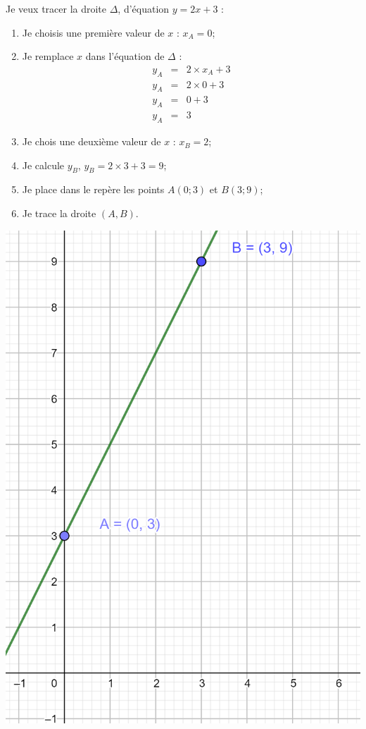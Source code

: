 \documentclass[12pt,a4paper]{article}
\begin{document}
Je veux tracer la droite $\Delta$, d'équation $ y = 2x + 3$ :
\begin{multicols}{2}
	
\begin{enumerate}
	\item Je choisis une première valeur de $x$ : $x_A = 0$;
	\item Je remplace $x$ dans l'équation de $\Delta$ :
		\begin{eqnarray*}
			y_A &=& 2 \times x_A + 3 \\
			y_A &=& 2 \times 0 + 3 \\
			y_A &=& 0 + 3 \\
			y_A &=& 3
		\end{eqnarray*} 
	\item Je chois une deuxième valeur de $x$ : $x_B = 2$;
	\item Je calcule $y_B$, $y_B = 2 \times 3 + 3 = 9$;
	\item Je place dans le repère les points $A(0;3)$ et $B(3;9)$;
	\item Je trace la droite $(A,B)$.
\end{enumerate}

\begin{center}
	\includegraphics[scale=0.3]{img/trace_droite}
\end{center}
\end{multicols}
\end{document}
